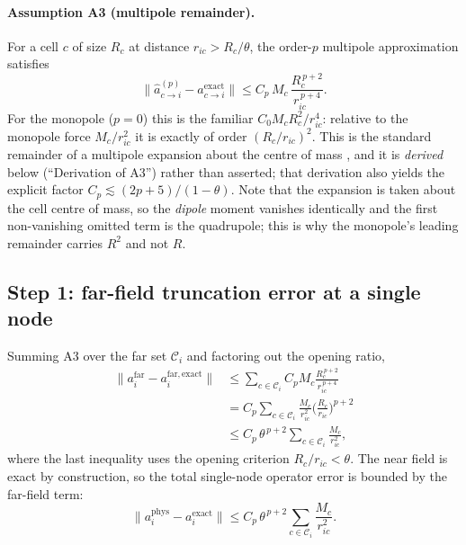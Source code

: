 \paragraph{Assumption A3 (multipole remainder).}
For a cell $c$ of size $R_c$ at distance $r_{ic}>R_c/\theta$, the order-$p$ multipole
approximation satisfies
\begin{equation}
\big\|\hat{a}_{c\to i}^{(p)}-a_{c\to i}^{\mathrm{exact}}\big\|
\le C_p\,M_c\,\frac{R_c^{\,p+2}}{r_{ic}^{\,p+4}}.
\end{equation}
For the monopole ($p=0$) this is the familiar $C_0 M_c R_c^{2}/r_{ic}^{4}$: relative to the
monopole force $M_c/r_{ic}^{2}$ it is exactly of order $(R_c/r_{ic})^{2}$. This is the
standard remainder of a multipole expansion about the centre of mass
\citep{greengard1987}, and it is \emph{derived} below (``Derivation of A3'') rather than
asserted; that derivation also yields the explicit factor
$C_p\lesssim(2p+5)/(1-\theta)$. Note that the
expansion is taken about the cell centre of mass, so the \emph{dipole} moment vanishes
identically and the first non-vanishing omitted term is the quadrupole; this is why the
monopole's leading remainder carries $R^2$ and not $R$.

\subsection{Step 1: far-field truncation error at a single node}
Summing A3 over the far set $\mathcal{C}_i$ and factoring out the opening ratio,
\begin{align}
\big\|a_i^{\mathrm{far}}-a_i^{\mathrm{far,exact}}\big\|
&\le\sum_{c\in\mathcal{C}_i}C_p M_c\frac{R_c^{\,p+2}}{r_{ic}^{\,p+4}}\nonumber\\
&=C_p\sum_{c\in\mathcal{C}_i}\frac{M_c}{r_{ic}^{2}}\Big(\frac{R_c}{r_{ic}}\Big)^{p+2}\nonumber\\
&\le C_p\,\theta^{\,p+2}\sum_{c\in\mathcal{C}_i}\frac{M_c}{r_{ic}^{2}},
\label{eq:step1}
\end{align}
where the last inequality uses the opening criterion $R_c/r_{ic}<\theta$. The near field is
exact by construction, so the total single-node operator error is bounded by the far-field
term:
\begin{equation}
\|a_i^{\mathrm{phys}}-a_i^{\mathrm{exact}}\|
\le C_p\,\theta^{\,p+2}\sum_{c\in\mathcal{C}_i}\frac{M_c}{r_{ic}^{2}}.
\label{eq:step1b}
\end{equation}

